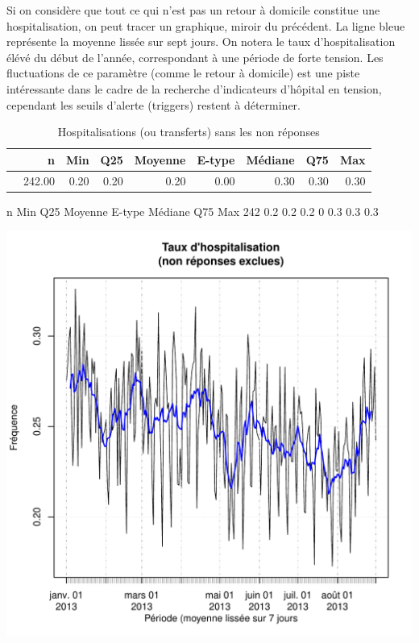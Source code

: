 \documentclass[12pt,english,french,twoside]{report}\usepackage[]{graphicx}\usepackage[]{color}
\makeatletter
\def\maxwidth{ %
  \ifdim\Gin@nat@width>\linewidth
    \linewidth
  \else
    \Gin@nat@width
  \fi
}
\makeatother
\begin{document}
Si on considère que tout ce qui n'est pas un retour à domicile constitue une hospitalisation, on peut tracer un graphique, miroir du précédent. La ligne bleue représente la moyenne lissée sur sept jours. On notera le taux d'hospitalisation élévé du début de l'année, correspondant à une période de forte tension. Les fluctuations de ce paramètre (comme le retour à domicile) est une piste intéressante dans le cadre de la recherche d'indicateurs d'hôpital en tension, cependant les seuils d'alerte (triggers) restent à déterminer.

\begin{table}[ht]
\centering
\begin{tabular}{rrrrrrrrr}
  \hline
 & n & Min & Q25 & Moyenne & E-type & Médiane & Q75 & Max \\ 
  \hline
 & 242.00 & 0.20 & 0.20 & 0.20 & 0.00 & 0.30 & 0.30 & 0.30 \\ 
   \hline
\end{tabular}
\caption[Hospitalisations]{Hospitalisations (ou transferts) sans les non réponses} 
\label{tab:hosp}
\end{table}
   n Min Q25 Moyenne E-type Médiane Q75 Max
 242 0.2 0.2     0.2      0     0.3 0.3 0.3

\includegraphics[width=\maxwidth]{figure/hospit} 
\end{document}
